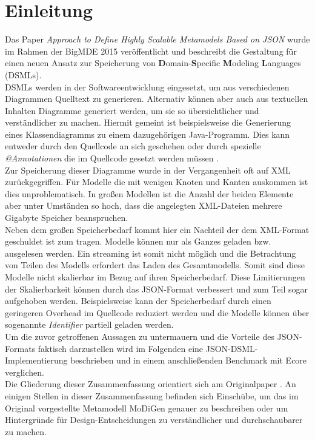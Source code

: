 \section{Einleitung}
Das Paper \textit{\glqq Approach to Define Highly Scalable Metamodels Based on JSON\grqq}\cite{gerhart2015approach} wurde im Rahmen der BigMDE 2015 veröffentlicht und beschreibt die Gestaltung für einen neuen Ansatz zur Speicherung von \textbf{D}omain-\textbf{S}pecific \textbf{M}odeling \textbf{L}anguages (DSMLs). \\
DSMLs werden in der Softwareentwicklung eingesetzt, um aus verschiedenen Diagrammen Quelltext zu generieren. Alternativ können aber auch aus textuellen Inhalten Diagramme generiert werden, um sie so übersichtlicher und verständlicher zu machen. Hiermit gemeint ist beispielsweise die Generierung eines Klassendiagramms zu einem dazugehörigen Java-Programm. Dies kann entweder durch den Quellcode an sich geschehen oder durch spezielle \textit{@Annotationen} die im Quellcode gesetzt werden müssen \cite{france2005domain}. \\
Zur Speicherung dieser Diagramme wurde in der Vergangenheit oft auf XML zurückgegriffen. Für Modelle die mit wenigen Knoten und Kanten auskommen ist dies unproblematisch. In großen Modellen ist die Anzahl der beiden Elemente aber unter Umständen so hoch, dass die angelegten XML-Dateien mehrere Gigabyte Speicher beanspruchen.\\ 
Neben dem großen Speicherbedarf kommt hier ein Nachteil der dem XML-Format geschuldet ist zum tragen. Modelle können nur als Ganzes geladen bzw. ausgelesen werden. Ein streaming ist somit nicht möglich und die Betrachtung von Teilen des Modells erfordert das Laden des Gesamtmodells. Somit sind diese Modelle nicht skalierbar im Bezug auf ihren Speicherbedarf. Diese Limitierungen der Skalierbarkeit können durch das JSON-Format verbessert und zum Teil sogar aufgehoben werden. Beispielsweise kann der Speicherbedarf durch einen geringeren Overhead im Quellcode reduziert werden und die Modelle können über sogenannte \textit{Identifier} partiell geladen werden. \\
Um die zuvor getroffenen Aussagen zu untermauern und die Vorteile des JSON-Formats faktisch darzustellen wird im Folgenden eine JSON-DSML-Implementierung beschrieben und in einem anschließenden Benchmark mit Ecore verglichen. \\
Die Gliederung dieser Zusammenfassung orientiert sich am Originalpaper \cite{gerhart2015approach}. An einigen Stellen in dieser Zusammenfassung befinden sich Einschübe, um das im Original vorgestellte Metamodell MoDiGen genauer zu beschreiben oder um Hintergründe für Design-Entscheidungen zu verständlicher und durchschaubarer zu machen. 


